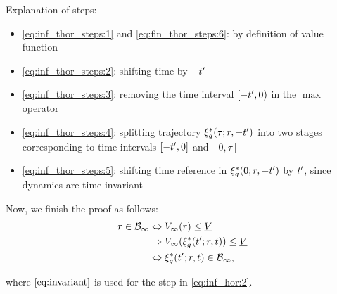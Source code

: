 \begin{IEEEproof}
  Explanation of steps:
  \begin{itemize}
    \item \eqref{eq:inf_thor_steps:1} and \eqref{eq:fin_thor_steps:6}: by definition of value function
    \item \eqref{eq:inf_thor_steps:2}: shifting time by $-t'$
    \item \eqref{eq:inf_thor_steps:3}: removing the time interval $[-t',0)$ in the $\max$ operator
    \item \eqref{eq:inf_thor_steps:4}: splitting trajectory $\xi_g^*(\tau; r, -t')$ into two stages corresponding to time intervals $[-t', 0]$ and $[0, \tau]$
    \item \eqref{eq:inf_thor_steps:5}: shifting time reference in $\xi_g^*(0; r, -t')$ by $t'$, since dynamics are time-invariant
  \end{itemize}
  
  Now, we finish the proof as follows:
  \begin{subequations} \label{eq:inf_hor}
    \begin{align}
    \rstate \in \TEB_\infty &\Leftrightarrow \valfunc_\infty(\rstate) \le \underline\valfunc \\
    & \Rightarrow \valfunc_\infty(\rtraj^*(\tvar'; \rstate, \tvar)) \le \underline\valfunc \label{eq:inf_hor:2}\\
    & \Leftrightarrow \rtraj^*(\tvar'; \rstate, \tvar) \in \TEB_\infty,
    \end{align}
  \end{subequations}
  
  \noindent where $\eqref{eq:invariant}$ is used for the step in \eqref{eq:inf_hor:2}.
  
\end{IEEEproof} 